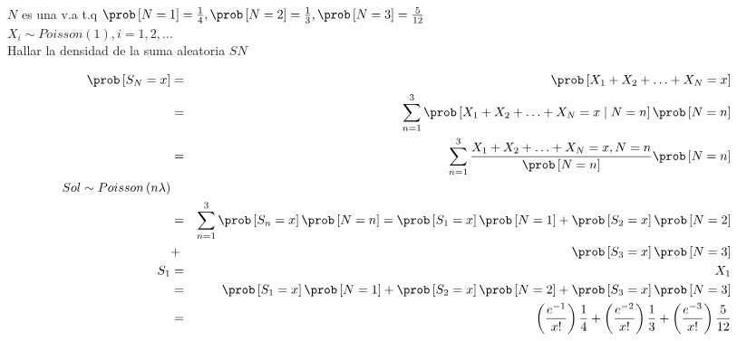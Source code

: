 \begin{Ejem} $N$ es una v.a t.q $\prob          \left[ N=1 \right]= \frac{1}{4},  \prob \left[ N = 2\right]= \frac{1}{3},  \prob \left[ N=3 \right]= \frac{5}{12}$ \\
 $X_{i} \sim Poisson \left(1 \right), i=1,2, \ldots$\\
 Hallar la densidad de la suma aleatoria $SN$
 
 \begin{eqnarray*}
 \prob \left[ S_{N} = x \right] &=& \prob \left[ X_{1}+ X_{2}+ \ldots + X_{N} = x\right]\\
 &=& \sum_{n=1}^{3} \prob \left[ X_{1}+ X_{2}+ \ldots + X_{N} = x \mid N=n \right] \prob \left[ N=n \right]\\
 &=&\sum_{n=1}^{3} \dfrac{X_{1}+ X_{2}+ \ldots + X_{N} = x , N=n}{\prob \left[N=n \right] } \prob \left[N=n \right]\\
 Sol \sim Poisson \left(n \lambda \right)\\
 &=& \sum_{n=1}^{3} \prob \left[S_{n}= x \right] \prob \left[ N=n\right]= \prob \left[ S_{1}=x \right] \prob \left[N=1 \right]+ \prob \left[S_{2}= x \right] \prob \left[ N=2 \right]\\ &+& \prob \left[S_{3}= x \right]\prob \left[N=3 \right]\\
 S_{1} &=& X_{1}\\
 &=&\prob \left[S_{1} = x \right] \prob \left[ N=1\right]+ \prob \left[ S_{2}= x \right] \prob \left[N=2 \right] + \prob  \left[S_{3}= x \right]\prob \left[ N=3 \right]\\
 &=& \left( \frac{e^{-1}}{x!}\right)\frac{1}{4}+ \left( \frac{e^{-2}}{x!} \right) \frac{1}{3} + \left( \frac{e^{-3}}{x!} \right) \frac{5}{12}
 \end{eqnarray*}
\end{Ejem}